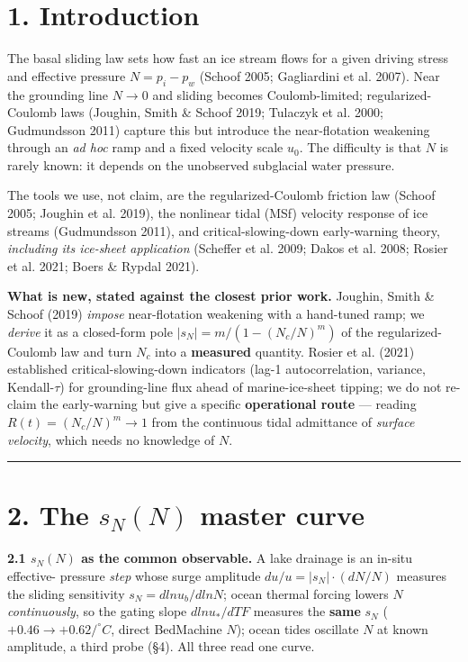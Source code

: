\documentclass[11pt]{article}
\begin{document}
\section*{1. Introduction}


The basal sliding law sets how fast an ice stream flows for a given driving stress and effective pressure $N=p_{i}-p_{w}$ (Schoof 2005; Gagliardini et al. 2007). Near the grounding line $N\to 0$ and sliding becomes Coulomb-limited; regularized-Coulomb laws (Joughin, Smith \& Schoof 2019; Tulaczyk et al. 2000; Gudmundsson 2011) capture this but introduce the near-flotation weakening through an \emph{ad hoc} ramp and a fixed velocity scale $u_{0}$. The difficulty is that $N$ is rarely known: it depends on the unobserved subglacial water pressure.


The tools we use, not claim, are the regularized-Coulomb friction law (Schoof 2005; Joughin et al. 2019), the nonlinear tidal (MSf) velocity response of ice streams (Gudmundsson 2011), and critical-slowing-down early-warning theory, \emph{including its ice-sheet application} (Scheffer et al. 2009; Dakos et al. 2008; Rosier et al. 2021; Boers \& Rypdal 2021).


\textbf{What is new, stated against the closest prior work.} Joughin, Smith \& Schoof (2019) \emph{impose} near-flotation weakening with a hand-tuned ramp; we \emph{derive} it as a closed-form pole $|s_{N}|=m/(1-(N_{c}/N)^{m})$ of the regularized-Coulomb law and turn $N_{c}$ into a \textbf{measured} quantity. Rosier et al. (2021) established critical-slowing-down indicators (lag-1 autocorrelation, variance, Kendall-\ensuremath{\tau}) for grounding-line flux ahead of marine-ice-sheet tipping; we do not re-claim the early-warning but give a specific \textbf{operational route} — reading $R(t)=(N_{c}/N)^{m}\to 1$ from the continuous tidal admittance of \emph{surface velocity}, which needs no knowledge of $N$.


\medskip\hrule\medskip


\section*{2. The $s_{N}(N)$ master curve}


\textbf{2.1 $s_{N}(N)$ as the common observable.} A lake drainage is an in-situ effective- pressure \emph{step} whose surge amplitude $du/u=|s_{N}|\cdot (dN/N)$ measures the sliding sensitivity $s_{N}=d ln u_{b}/d ln N$; ocean thermal forcing lowers $N$ \emph{continuously}, so the gating slope $d ln u_*/dTF$ measures the \textbf{same} $s_{N}$ ($+0.46\to +0.62/^{\circ}C$, direct BedMachine $N$); ocean tides oscillate $N$ at known amplitude, a third probe (§4). All three read one curve.
\end{document}
